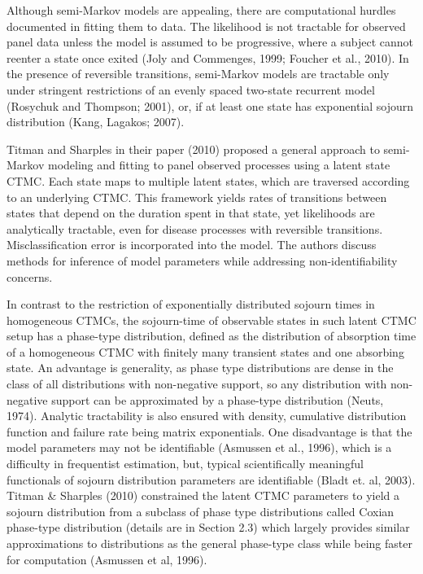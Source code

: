 \documentclass{uwstat572}
\begin{document}
Although semi-Markov models are appealing, there are computational hurdles documented in fitting them to data. The likelihood is not tractable for observed panel data unless the model is assumed to be progressive, where a subject cannot reenter a state once exited (Joly and Commenges, 1999; Foucher et al., 2010). In the presence of reversible transitions, semi-Markov models are tractable only under stringent restrictions of an evenly spaced two-state recurrent model (Rosychuk and Thompson; 2001), or, if at least one state has exponential sojourn distribution (Kang, Lagakos; 2007).

Titman and Sharples in their paper (2010) proposed a general approach to semi-Markov modeling and fitting to panel observed processes using a latent state CTMC. Each state maps to multiple latent states, which are traversed according to an underlying CTMC. This framework yields rates of transitions between states that depend on the duration spent in that state, yet likelihoods are analytically tractable, even for disease processes with reversible transitions. Misclassification error is incorporated into the model. The authors discuss methods for inference of model parameters while addressing non-identifiability concerns.


In contrast to the restriction of exponentially distributed sojourn times in homogeneous CTMCs, the sojourn-time of observable states in such latent CTMC setup has a phase-type distribution, defined as the distribution of absorption time of a homogeneous CTMC with finitely many transient states and one absorbing state. An advantage is generality, as phase type distributions are dense in the class of all distributions with non-negative support, so any distribution with non-negative support can be approximated by a phase-type distribution (Neuts, 1974). Analytic tractability is also ensured with density, cumulative distribution function and failure rate being matrix exponentials. One disadvantage is that the model parameters may not be identifiable (Asmussen et al., 1996), which is a difficulty in frequentist estimation, but, typical scientifically meaningful functionals of sojourn distribution parameters are identifiable (Bladt et. al, 2003). Titman \& Sharples (2010) constrained the latent CTMC parameters to yield a sojourn distribution from a subclass of phase type distributions called Coxian phase-type distribution (details are in Section 2.3) which largely provides similar approximations to distributions as the general phase-type class while being faster for computation (Asmussen et al, 1996).
\end{document}
